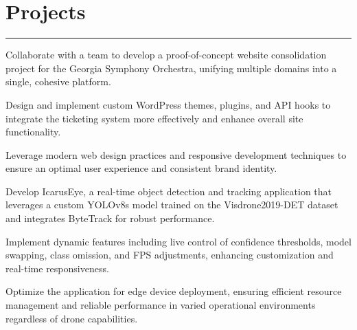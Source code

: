 \documentclass[]{styling}
\begin{document}
{\begin{minipage}[t]{0.6\textwidth}
        \section*{Projects}
        \hrule
        \vspace{1 em}
        \begin{tightemize}
            \item Collaborate with a team to develop a proof-of-concept website consolidation 
            project for the Georgia Symphony Orchestra, unifying multiple domains into a single, 
            cohesive platform.
            \item Design and implement custom WordPress themes, plugins, and API hooks to  
            integrate the ticketing system more effectively and enhance overall site functionality.
            \item Leverage modern web design practices and responsive development techniques to ensure 
            an optimal user experience and consistent brand identity.
        \end{tightemize}
        \sectionsep

        \begin{tightemize}
            \item Develop IcarusEye, a real-time object detection and tracking application that leverages 
            a custom YOLOv8s model trained on the Visdrone2019-DET dataset and integrates ByteTrack for 
            robust performance.
            \item Implement dynamic features including live control of confidence thresholds, model swapping, 
            class omission, and FPS adjustments, enhancing customization and real-time responsiveness.
            \item Optimize the application for edge device deployment, ensuring efficient resource management 
            and reliable performance in varied operational environments regardless of drone capabilities.
        \end{tightemize}
        \sectionsep
    \end{minipage}
}

\noindent\usebox{\ColA}\hfill\usebox{\ColB}
\end{document}
